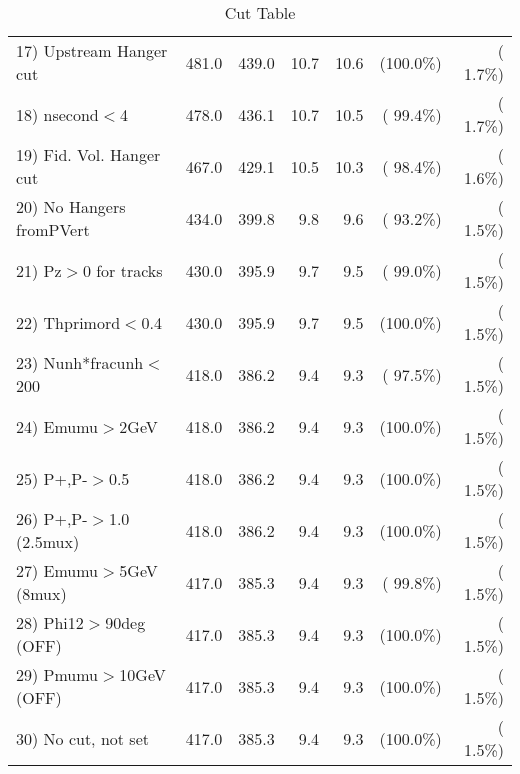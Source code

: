 \begin{table}[h!]
\begin{tabular}{||l||r|r|r|r|r|r||}
 17) Upstream Hanger cut  &        481.0 &        439.0 &         10.7 &         10.6 & (100.0\%) & (  1.7\%) \\
 18) nsecond$<$4          &        478.0 &        436.1 &         10.7 &         10.5 & ( 99.4\%) & (  1.7\%) \\
 19) Fid. Vol. Hanger cut &        467.0 &        429.1 &         10.5 &         10.3 & ( 98.4\%) & (  1.6\%) \\
 20) No Hangers fromPVert &        434.0 &        399.8 &          9.8 &          9.6 & ( 93.2\%) & (  1.5\%) \\
 21) Pz$>$0 for tracks    &        430.0 &        395.9 &          9.7 &          9.5 & ( 99.0\%) & (  1.5\%) \\
 22) Thprimord$<$0.4      &        430.0 &        395.9 &          9.7 &          9.5 & (100.0\%) & (  1.5\%) \\
 23) Nunh*fracunh$<$200   &        418.0 &        386.2 &          9.4 &          9.3 & ( 97.5\%) & (  1.5\%) \\
 24) Emumu$>$2GeV         &        418.0 &        386.2 &          9.4 &          9.3 & (100.0\%) & (  1.5\%) \\
 25) P+,P-$>$0.5          &        418.0 &        386.2 &          9.4 &          9.3 & (100.0\%) & (  1.5\%) \\
 26) P+,P-$>$1.0 (2.5mux) &        418.0 &        386.2 &          9.4 &          9.3 & (100.0\%) & (  1.5\%) \\
 27) Emumu$>$5GeV  (8mux) &        417.0 &        385.3 &          9.4 &          9.3 & ( 99.8\%) & (  1.5\%) \\
 28) Phi12$>$90deg  (OFF) &        417.0 &        385.3 &          9.4 &          9.3 & (100.0\%) & (  1.5\%) \\
 29) Pmumu$>$10GeV  (OFF) &        417.0 &        385.3 &          9.4 &          9.3 & (100.0\%) & (  1.5\%) \\
 30) No cut, not set      &        417.0 &        385.3 &          9.4 &          9.3 & (100.0\%) & (  1.5\%) \\
 \hline
 \hline
 \end{tabular}
 \caption{Cut Table           }
 \label{tab-cutcohjpsi-mumu_cohpip}
 \end{table}

